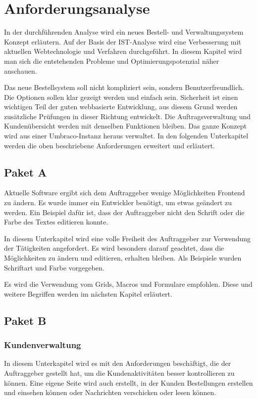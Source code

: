 \chapter{Anforderungsanalyse}

In der durchführenden Analyse wird ein neues Bestell- und Verwaltungssystem Konzept erläutern. Auf der Basis der IST-Analyse wird eine Verbesserung mit aktuellen Webtechnologie und Verfahren durchgeführt.
In diesem Kapitel wird man sich die entstehenden Probleme und Optimierungspotenzial näher anschauen.

Das neue Bestellsystem soll nicht kompliziert sein, sondern Benutzerfreundlich. Die Optionen sollen klar gezeigt werden und einfach sein. Sicherheit ist einen wichtigen Teil der guten webbasierte Entwicklung, aus diesem Grund werden zusätzliche Prüfungen in dieser Richtung entwickelt.
Die Auftragsverwaltung und Kundenübersicht werden mit denselben Funktionen bleiben.
Das ganze Konzept wird aus einer Umbraco-Instanz heraus verwaltet.
In den folgenden Unterkapitel werden die oben beschriebene Anforderungen erweitert und erläutert.


\section{Paket A}
Aktuelle Software ergibt sich dem Auftraggeber wenige Möglichkeiten Frontend zu ändern. Es wurde immer ein Entwickler benötigt, um etwas geändert zu werden. Ein Beispiel dafür ist, dass der Auftraggeber nicht den Schrift oder die Farbe des Textes editieren konnte.
   
In diesem Unterkapitel wird eine volle Freiheit des Auftraggeber zur Verwendung der Tätigkeiten angefordert. Es wird besonders darauf geachtet, dass die Möglichkeiten zu ändern und editieren, erhalten bleiben. Als Beispiele wurden Schriftart und Farbe vorgegeben.

Es wird die Verwendung vom Grids, Macros und Formulare empfohlen.
Diese und weitere Begriffen werden im nächsten Kapitel erläutert.


\section{Paket B}


\subsection{Kundenverwaltung}

In diesem Unterkapitel wird es mit den Anforderungen beschäftigt, die der Auftraggeber gestellt hat, um die Kundenaktivitäten besser kontrollieren zu können. Eine eigene Seite wird auch erstellt, in der Kunden Bestellungen erstellen und einsehen können oder Nachrichten verschicken oder lesen können.


